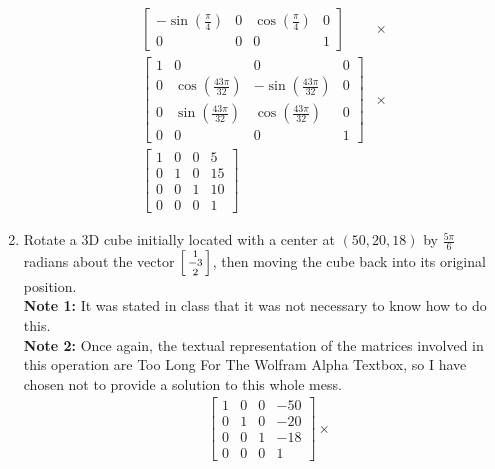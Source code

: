 \documentclass[a4paper,12pt]{article}
\begin{document}
\begin{enumerate}
\begin{align*}
\begin{bmatrix}
            -\sin(\frac{\pi}{4}) & 0 & \cos(\frac{\pi}{4}) & 0 \\
            0                    & 0 & 0                   & 1
        \end{bmatrix}
        &\times \\
        \begin{bmatrix}
            1 & 0                       & 0                        & 0 \\
            0 & \cos(\frac{43 \pi}{32}) & -\sin(\frac{43 \pi}{32}) & 0 \\
            0 & \sin(\frac{43 \pi}{32}) & \cos(\frac{43 \pi}{32})  & 0 \\
            0 & 0                       & 0                        & 1
        \end{bmatrix}
        &\times \\
        \begin{bmatrix}
            1 & 0 & 0 & 5  \\
            0 & 1 & 0 & 15 \\
            0 & 0 & 1 & 10 \\
            0 & 0 & 0 & 1
        \end{bmatrix}
    \end{align*}
    \item Rotate a 3D cube initially located with a center at $(50, 20, 18)$ by $\frac{5\pi}{6}$ radians about the vector $\begin{bsmallmatrix}
    1\\-3\\2
    \end{bsmallmatrix}$, then moving the cube back into its original position.\\
    \textbf{Note 1:} It was stated in class that it was not necessary to know how to do this. \\
    \textbf{Note 2:} Once again, the textual representation of the matrices involved in this operation are Too Long For The Wolfram Alpha Textbox, so I have chosen not to provide a solution to this whole mess.
    \begin{align*}
        &\begin{bmatrix}
            1 & 0 & 0 & -50 \\
            0 & 1 & 0 & -20 \\
            0 & 0 & 1 & -18 \\
            0 & 0 & 0 & 1
        \end{bmatrix}
        \times \\

\end{align*}
\end{enumerate}
\end{document}
